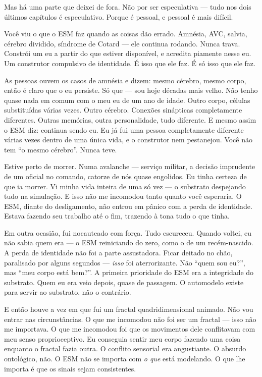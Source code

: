 \documentclass[11pt, twoside, openright]{book}
\begin{document}
Mas há uma parte que deixei de fora. Não por ser especulativa --- tudo nos dois últimos capítulos é especulativo. Porque é pessoal, e pessoal é mais difícil.

Você viu o que o ESM faz quando as coisas dão errado. Amnésia, AVC, salvia, cérebro dividido, síndrome de Cotard --- ele continua rodando. Nunca trava. Constrói um eu a partir do que estiver disponível, e acredita piamente nesse eu. Um construtor compulsivo de identidade. É isso que ele faz. É só isso que ele faz.

As pessoas ouvem os casos de amnésia e dizem: mesmo cérebro, mesmo corpo, então é claro que o eu persiste. Só que --- sou hoje décadas mais velho. Não tenho quase nada em comum com o meu eu de um ano de idade. Outro corpo, células substituídas várias vezes. Outro cérebro. Conexões sinápticas completamente diferentes. Outras memórias, outra personalidade, tudo diferente. E mesmo assim o ESM diz: continua sendo eu. Eu já fui uma pessoa completamente diferente várias vezes dentro de uma única vida, e o construtor nem pestanejou. Você não tem ``o mesmo cérebro''. Nunca teve.

Estive perto de morrer. Numa avalanche --- serviço militar, a decisão imprudente de um oficial no comando, catorze de nós quase engolidos. Eu tinha certeza de que ia morrer. Vi minha vida inteira de uma só vez --- o substrato despejando tudo na simulação. E isso não me incomodou tanto quanto você esperaria. O ESM, diante do desligamento, não entrou em pânico com a perda de identidade. Estava fazendo seu trabalho até o fim, trazendo à tona tudo o que tinha.

Em outra ocasião, fui nocauteado com força. Tudo escureceu. Quando voltei, eu não sabia quem era --- o ESM reiniciando do zero, como o de um recém-nascido. A perda de identidade não foi a parte assustadora. Ficar deitado no chão, paralisado por alguns segundos --- \textit{isso} foi aterrorizante. Não ``quem sou eu?'', mas ``meu corpo está bem?''. A primeira prioridade do ESM era a integridade do substrato. Quem eu era veio depois, quase de passagem. O automodelo existe para servir ao substrato, não o contrário.

E então houve a vez em que fui um fractal quadridimensional animado. Não vou entrar nas circunstâncias. O que me incomodou não foi ser um fractal --- isso não me importava. O que me incomodou foi que os movimentos dele conflitavam com meu senso proprioceptivo. Eu conseguia sentir meu corpo fazendo uma coisa enquanto o fractal fazia outra. O conflito sensorial era angustiante. O absurdo ontológico, não. O ESM não se importa com \textit{o que} está modelando. O que lhe importa é que os sinais sejam consistentes.
\end{document}
